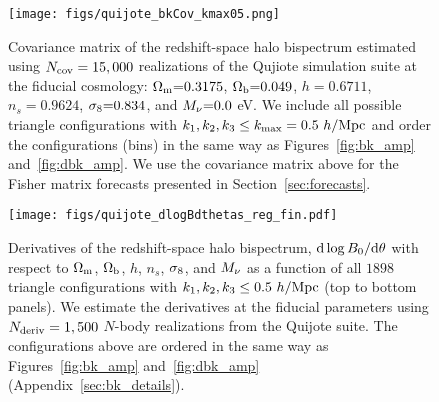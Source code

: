 \begin{figure}
\begin{center}
    \texttt{[image: figs/quijote\_bkCov\_kmax05.png]} 
    \caption{Covariance matrix of the redshift-space halo bispectrum estimated 
    using $N_{\rm cov} = 15,000$ realizations of the Qujiote simulation suite at 
    the fiducial cosmology: $\Omega_{\rm m}{=}0.3175$, $\Omega_{\rm b}{=}0.049$, $h{=}0.6711$, $n_s{=}0.9624$, $\sigma_8{=}0.834$, 
    and $M_\nu{=}0.0$ eV. We include all possible triangle configurations with 
    $k_1, k_2, k_3 \leq k_{\rm max} = 0.5~h/{\rm Mpc}$ and order the configurations 
    (bins) in the same way as Figures~\ref{fig:bk_amp} and~\ref{fig:dbk_amp}. We 
    use the covariance matrix above for the Fisher matrix forecasts presented in 
    Section~\ref{sec:forecasts}. 
    }
\label{fig:bk_cov}
\end{center}
\end{figure}

\begin{figure}
\begin{center}
    \texttt{[image: figs/quijote\_dlogBdthetas\_reg\_fin.pdf]} 
    \caption{Derivatives of the redshift-space halo bispectrum, ${\rm d}\log B_0 / {\rm d} \theta$ 
    with respect to $\Omega_{\rm m}$, $\Omega_{\rm b}$, $h$, $n_s$, $\sigma_8$, and $M_\nu$ as a function 
    of all $1898$ triangle configurations with $k_1, k_2, k_3 \leq 0.5~h/{\rm Mpc}$ 
    (top to bottom panels). We estimate the derivatives at the fiducial parameters 
    using $N_{\rm deriv} = 1,500$ $N$-body realizations from the Quijote suite. 
    The configurations above are ordered in the same way as Figures~\ref{fig:bk_amp} 
    and~\ref{fig:dbk_amp} (Appendix~\ref{sec:bk_details}). 
    }
\label{fig:bk_deriv}
\end{center}
\end{figure}


